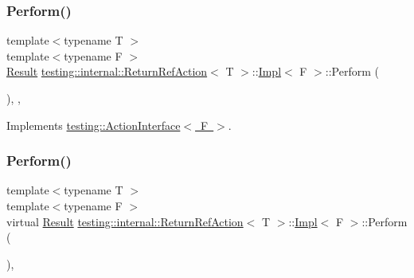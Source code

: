 \subsubsection{\texorpdfstring{Perform()}{Perform()}\hspace{0.1cm}{\footnotesize\ttfamily [2/3]}}
{\footnotesize\ttfamily template$<$typename T $>$ \\
template$<$typename F $>$ \\
\mbox{\hyperlink{classtesting_1_1_action_interface_a7477de2fe3e4e01c59db698203acaee7}{Result}} \mbox{\hyperlink{classtesting_1_1internal_1_1_return_ref_action}{testing\+::internal\+::\+Return\+Ref\+Action}}$<$ T $>$\+::\mbox{\hyperlink{classtesting_1_1internal_1_1_return_ref_action_1_1_impl}{Impl}}$<$ F $>$\+::Perform (\begin{DoxyParamCaption}\item[{const \mbox{\hyperlink{classtesting_1_1_action_interface_af72720d864da4d606629e83edc003511}{Argument\+Tuple}} \&}]{ }\end{DoxyParamCaption})\hspace{0.3cm}{\ttfamily [inline]}, {\ttfamily [override]}, {\ttfamily [virtual]}}



Implements \mbox{\hyperlink{classtesting_1_1_action_interface_a20f8624fcea1786f2992b358760422a0}{testing\+::\+Action\+Interface$<$ F $>$}}.

\mbox{\label{classtesting_1_1internal_1_1_return_ref_action_1_1_impl_ae65024d38782cd53a194346ace6ed9af}} 
\subsubsection{\texorpdfstring{Perform()}{Perform()}\hspace{0.1cm}{\footnotesize\ttfamily [3/3]}}
{\footnotesize\ttfamily template$<$typename T $>$ \\
template$<$typename F $>$ \\
virtual \mbox{\hyperlink{classtesting_1_1_action_interface_a7477de2fe3e4e01c59db698203acaee7}{Result}} \mbox{\hyperlink{classtesting_1_1internal_1_1_return_ref_action}{testing\+::internal\+::\+Return\+Ref\+Action}}$<$ T $>$\+::\mbox{\hyperlink{classtesting_1_1internal_1_1_return_ref_action_1_1_impl}{Impl}}$<$ F $>$\+::Perform (\begin{DoxyParamCaption}\item[{const \mbox{\hyperlink{classtesting_1_1_action_interface_af72720d864da4d606629e83edc003511}{Argument\+Tuple}} \&}]{ }\end{DoxyParamCaption})\hspace{0.3cm}{\ttfamily [inline]}, {\ttfamily [virtual]}}



